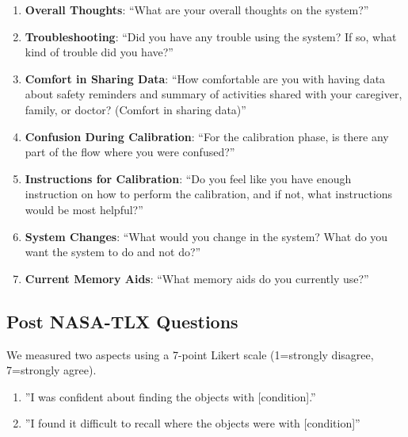 \begin{enumerate}
    \item \textbf{Overall Thoughts}: ``What are your overall thoughts on the system?''
    \item \textbf{Troubleshooting}: ``Did you have any trouble using the system? If so, what kind of trouble did you have?''
    \item \textbf{Comfort in Sharing Data}: ``How comfortable are you with having data about safety reminders and summary of activities shared with your caregiver, family, or doctor? (Comfort in sharing data)''
    \item \textbf{Confusion During Calibration}: ``For the calibration phase, is there any part of the flow where you were confused?''
    \item \textbf{Instructions for Calibration}: ``Do you feel like you have enough instruction on how to perform the calibration, and if not, what instructions would be most helpful?''
    \item \textbf{System Changes}: ``What would you change in the system? What do you want the system to do and not do?''
    \item \textbf{Current Memory Aids}: ``What memory aids do you currently use?''
\end{enumerate}


\subsection{Post NASA-TLX Questions}
\label{appendixSelfReportedConfidence}
We measured two aspects using a 7-point Likert scale (1=strongly disagree, 7=strongly agree).\label{secinterview}

\begin{enumerate}
    \item  ''I was confident about finding the objects with [condition].''
    \item ''I found it difficult to recall where the objects were with [condition]''
\end{enumerate}
